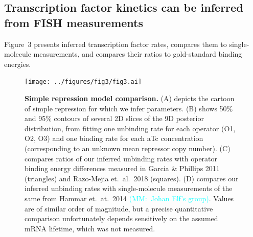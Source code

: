 \documentclass[12pt]{article}%
\newcommand{\mmnote}[1]{\textcolor{cyan}{(MM:~#1)}}
\begin{document}
\subsection{Transcription factor kinetics can be inferred from FISH measurements}
Figure~3 presents inferred transcription factor rates, compares
them to single-molecule measurements, and compares their ratios
to gold-standard binding energies.
\begin{figure}%
\centering
\texttt{[image: ../figures/fig3/fig3.ai]}
\caption{\textbf{Simple repression model comparison.}
(A) depicts the cartoon of simple repression for which we infer parameters.
(B) shows 50\% and 95\% contours of several 2D slices of the 9D posterior
distribution, from fitting one unbinding rate for each operator (O1, O2, O3)
and one binding rate for each aTc concentration (corresponding to an
unknown mean repressor copy number).
(C) compares ratios of our inferred unbinding rates with operator
binding energy differences measured in Garcia \& Phillips 2011 (triangles)
and Razo-Mejia et.\ al.\ 2018 (squares).
(D) compares our inferred unbinding rates with single-molecule measurements
of the same from Hammar et.\ at.\ 2014 \mmnote{Johan Elf's group}.
Values are of similar order of magnitude,
but a precise quantitative comparison unfortunately depends sensitively
on the assumed mRNA lifetime, which was not measured.
    }
\label{fig3:kR_inferences}
\end{figure}
\end{document}
